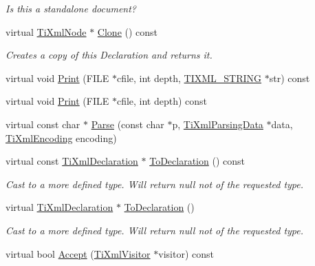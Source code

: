 \begin{DoxyCompactItemize}
\begin{DoxyCompactList}\small\item\em Is this a standalone document? \end{DoxyCompactList}\item 
virtual \hyperlink{class_ti_xml_node}{Ti\+Xml\+Node} $\ast$ \hyperlink{class_ti_xml_declaration_a35dc1455f69b79e81cae28e186944610}{Clone} () const
\begin{DoxyCompactList}\small\item\em Creates a copy of this Declaration and returns it. \end{DoxyCompactList}\item 
virtual void \hyperlink{class_ti_xml_declaration_ace687d02a5a25a060ae3802abb1b3f55}{Print} (F\+I\+LE $\ast$cfile, int depth, \hyperlink{tinyxml_8h_a92bada05fd84d9a0c9a5bbe53de26887}{T\+I\+X\+M\+L\+\_\+\+S\+T\+R\+I\+NG} $\ast$str) const
\item 
virtual void \hyperlink{class_ti_xml_declaration_ae46cff6565f299210ab945e78bf28514}{Print} (F\+I\+LE $\ast$cfile, int depth) const
\item 
virtual const char $\ast$ \hyperlink{class_ti_xml_declaration_a9839ea97ed687a2b7342fd7b0f04361b}{Parse} (const char $\ast$p, \hyperlink{class_ti_xml_parsing_data}{Ti\+Xml\+Parsing\+Data} $\ast$data, \hyperlink{tinyxml_8h_a88d51847a13ee0f4b4d320d03d2c4d96}{Ti\+Xml\+Encoding} encoding)
\item 
virtual const \hyperlink{class_ti_xml_declaration}{Ti\+Xml\+Declaration} $\ast$ \hyperlink{class_ti_xml_declaration_aab62703b620d9b9391b482dc1835ecf6}{To\+Declaration} () const
\begin{DoxyCompactList}\small\item\em Cast to a more defined type. Will return null not of the requested type. \end{DoxyCompactList}\item 
virtual \hyperlink{class_ti_xml_declaration}{Ti\+Xml\+Declaration} $\ast$ \hyperlink{class_ti_xml_declaration_a6bd3d1daddcaeb9543c24bfd090969ce}{To\+Declaration} ()
\begin{DoxyCompactList}\small\item\em Cast to a more defined type. Will return null not of the requested type. \end{DoxyCompactList}\item 
virtual bool \hyperlink{class_ti_xml_declaration_aa1b6bade6c989407ce9881bdfc73c1e6}{Accept} (\hyperlink{class_ti_xml_visitor}{Ti\+Xml\+Visitor} $\ast$visitor) const
\end{DoxyCompactItemize}
